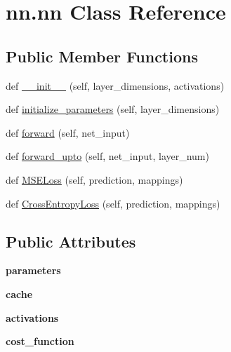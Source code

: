 \hypertarget{classnn_1_1nn}{}\section{nn.\+nn Class Reference}
\label{classnn_1_1nn}
\subsection*{Public Member Functions}
\begin{DoxyCompactItemize}
\item 
def \hyperlink{classnn_1_1nn_ad7304c7932970a07bf2869e97b79e0b5}{\+\_\+\+\_\+init\+\_\+\+\_\+} (self, layer\+\_\+dimensions, activations)
\item 
def \hyperlink{classnn_1_1nn_a9821fed1369b4d709fe297fe9e07d97b}{initialize\+\_\+parameters} (self, layer\+\_\+dimensions)
\item 
def \hyperlink{classnn_1_1nn_ae07002745b03901814d92ac66fe87781}{forward} (self, net\+\_\+input)
\item 
def \hyperlink{classnn_1_1nn_ac3d2b61ed992dc615eacda8e75a61a2b}{forward\+\_\+upto} (self, net\+\_\+input, layer\+\_\+num)
\item 
def \hyperlink{classnn_1_1nn_ae74a0f21e8722ea82a0f94135a81a348}{M\+S\+E\+Loss} (self, prediction, mappings)
\item 
def \hyperlink{classnn_1_1nn_a822299322a0b513f8985e61096be45bc}{Cross\+Entropy\+Loss} (self, prediction, mappings)
\end{DoxyCompactItemize}
\subsection*{Public Attributes}
\begin{DoxyCompactItemize}
\item 
\mbox{\label{classnn_1_1nn_a69da89bd6d17dbc8596ab586b7678237}} 
{\bfseries parameters}
\item 
\mbox{\label{classnn_1_1nn_a1f75a6242fc9ee82ca2632e18979b4d3}} 
{\bfseries cache}
\item 
\mbox{\label{classnn_1_1nn_acb7fb4cc0db120b007ef1ab1f82d7ba0}} 
{\bfseries activations}
\item 
\mbox{\label{classnn_1_1nn_adb4a96a154d03db3722022600e134c7f}} 
{\bfseries cost\+\_\+function}
\end{DoxyCompactItemize}


